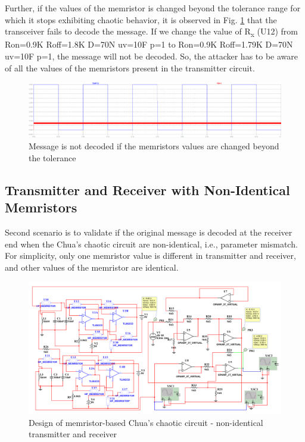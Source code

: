 Further, if the values of the memristor is changed beyond the tolerance range for which it stops exhibiting chaotic behavior, it is observed in Fig. \ref{fig:12} that the transceiver fails to decode the message.   
If we change the value of R\textsubscript{x} (U12) from Ron=0.9K Roff=1.8K D=70N uv=10F p=1 to Ron=0.9K Roff=1.79K D=70N uv=10F p=1, the message will not be decoded. So, the attacker has to be aware of all the values of the memristors present in the transmitter circuit. 

\begin{figure}[ht]
    \centering
    \includegraphics[width = 0.8\linewidth]{figs/Fig18U11_1_8K_no_decode.PNG}
    \caption{Message is not decoded if the memristors values are changed beyond the tolerance}
    \label{fig:12}
\end{figure}

\subsection*{Transmitter and Receiver with Non-Identical Memristors}
Second scenario is to validate if the original message is decoded at the receiver end when the Chua's chaotic circuit are non-identical, i.e., parameter mismatch. For simplicity, only one memristor value is different in transmitter and receiver, and other values of the memristor are identical. %



\begin{figure}[!t]    
\centering
    \includegraphics[width = 1\linewidth]{figs/Fig19multisim_Tx_Rx.PNG}
    \caption{Design of memristor-based Chua's chaotic circuit - non-identical transmitter and receiver}
    \label{fig:13}
\end{figure}

